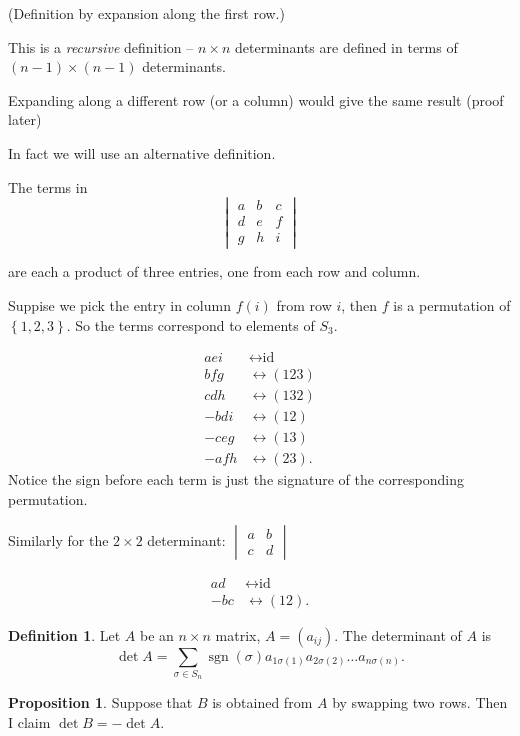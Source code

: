 \documentclass{article}
\theoremstyle{definition} \newtheorem*{definition}{Definition}
\newtheorem{proposition}[theorem]{Proposition}
\DeclareMathOperator{\sgn}{sgn} \DeclareMathOperator{\id}{id}
\begin{document}
(Definition by expansion along the first row.)

This is a \emph{recursive} definition -- $n \times n$ determinants are defined
in terms of $(n-1) \times (n-1)$ determinants.

Expanding along a different row (or a column) would give the same result (proof
later)


In fact we will use an alternative definition.

The terms in \[ \begin{vmatrix} a & b & c \\ d & e & f \\ g & h & i
\end{vmatrix} \]

are each a product of three entries, one from each row and column.

Suppise we pick the entry in column $f(i)$ from row $i$, then $f$ is a
permutation of $\left\{ 1,2,3 \right\}$. So the terms correspond to elements of
$S_3$.

\begin{align*} aei &\leftrightarrow \text{id} \\ bfg &\leftrightarrow (123) \\
  cdh &\leftrightarrow (132) \\ -bdi &\leftrightarrow (12) \\ -ceg
  &\leftrightarrow (13) \\ -afh &\leftrightarrow (23).  \end{align*} Notice the
sign before each term is just the signature of the corresponding permutation.

Similarly for the $2 \times 2$ determinant: $\begin{vmatrix}a & b \\ c &
  d\end{vmatrix}$

\begin{align*} ad &\leftrightarrow \text{id} \\ -bc &\leftrightarrow (12).
\end{align*}

\begin{definition} Let $A$ be an $n \times n$ matrix, $A = (a_{ij})$. The
  determinant of $A$ is \[ \det A = \sum_{\sigma \in S_n} \sgn(\sigma)
  a_{1\sigma(1)}a_{2\sigma (2)}\dots a_{n \sigma (n)}.  \] \end{definition}

\begin{proposition} \label{prp:swaprows} Suppose that $B$ is obtained from $A$
  by swapping two rows. Then I claim $\det B = -\det A$.  \end{proposition}
\end{document}
